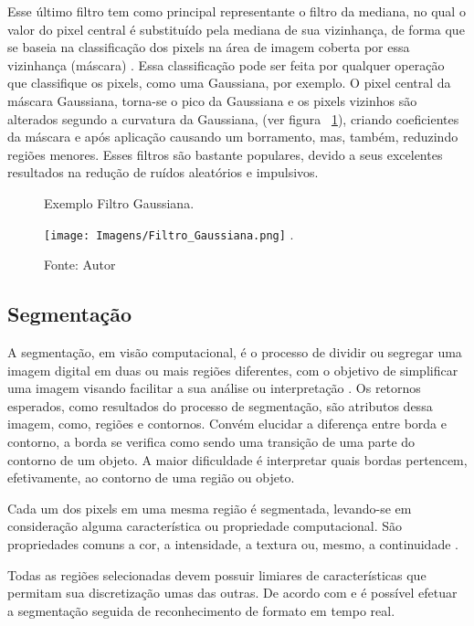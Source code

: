 Esse último filtro tem como principal representante o filtro da mediana, no qual o valor do pixel central é substituído pela mediana de sua vizinhança, de forma que se baseia na classificação dos pixels na área de imagem coberta por essa vizinhança (máscara) \cite{Gonzalez}. Essa classificação pode ser feita por qualquer operação que classifique os pixels, como uma Gaussiana, por exemplo. O pixel central da máscara Gaussiana, torna-se o pico da Gaussiana e os pixels vizinhos são alterados segundo a curvatura da Gaussiana, (ver figura ~\ref{Fig:FiltroGaussiana}), criando coeficientes da máscara e após aplicação causando um borramento, mas, também, reduzindo regiões menores. 
Esses filtros são bastante populares, devido a seus excelentes resultados na redução de ruídos aleatórios e impulsivos.


\begin{figure}[!t]
\centering \caption{Exemplo Filtro Gaussiana.}
\texttt{[image: Imagens/Filtro\_Gaussiana.png]}
\DeclareGraphicsExtensions.
\caption*{Fonte: Autor}
\label{Fig:FiltroGaussiana}
\end{figure}




\subsection{Segmentação}

A segmentação, em visão computacional, é o processo de dividir ou segregar uma imagem digital em duas ou mais regiões diferentes, com o objetivo de simplificar uma imagem visando facilitar a sua análise ou interpretação \cite{Gonzalez}. Os retornos esperados, como resultados do processo de segmentação, são atributos dessa imagem, como, regiões e contornos. Convém elucidar a diferença entre borda e contorno, a borda se verifica como sendo uma transição de uma parte do contorno de um objeto. A maior dificuldade é interpretar quais bordas pertencem, efetivamente, ao contorno de uma região ou objeto.

Cada um dos pixels em uma mesma região é segmentada, levando-se em consideração alguma característica ou propriedade computacional. São propriedades comuns a cor, a intensidade, a textura ou, mesmo, a continuidade \cite{Gonzalez}. 

Todas as regiões selecionadas devem possuir limiares de características que permitam sua discretização umas das outras. De acordo com  e  é possível efetuar a segmentação seguida de reconhecimento de formato em tempo real. 

